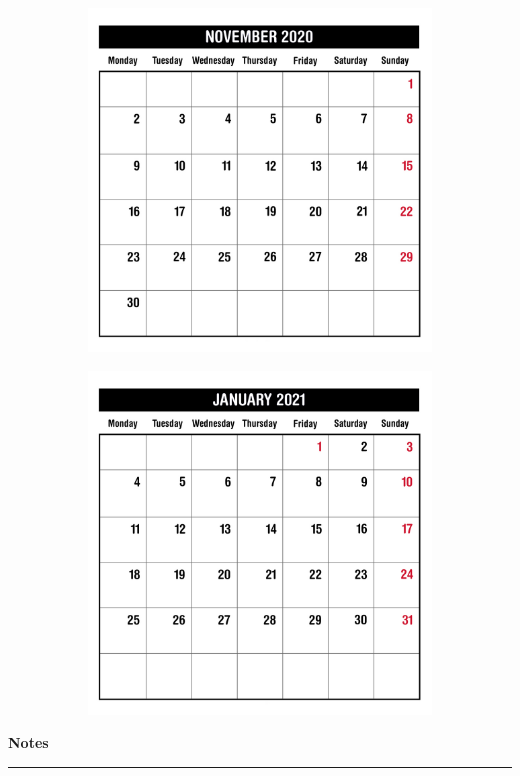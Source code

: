 \begin{figure}[H]
\begin{subfigure}[l]{0.5\textwidth}
    \includegraphics[width=\textwidth]{Sources/MonthViews/November20.jpg}
  \end{subfigure}
  \begin{subfigure}[l]{0.5\textwidth}
    \includegraphics[width=\textwidth]{Sources/MonthViews/January21.jpg}
  \end{subfigure}
\end{figure}


\newpage
\begin{notesbox}
\textbf{Notes} \\
\rule{\linewidth}{0.02cm}
\end{notesbox}